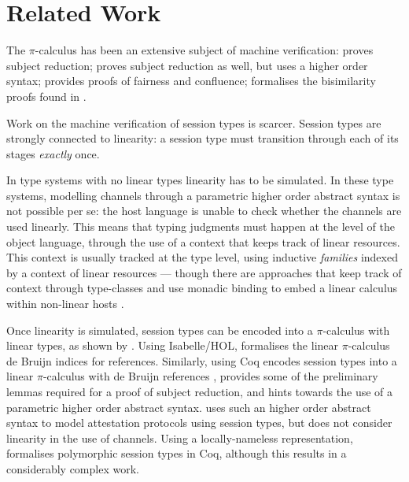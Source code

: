 \documentclass{mproj}
\newcommand{\picalc}{$\pi$-calculus}
\begin{document}

\chapter{Related Work}\label{related-work}

The \picalc{} has been an extensive subject of machine verification: \cite{Henry-Gerard1999} proves subject reduction; \cite{Despeyroux2000} proves subject reduction as well, but uses a higher order syntax; \cite{Affeldt2008} provides proofs of fairness and confluence; \cite{Honsell2001} formalises the bisimilarity proofs found in \cite{Walker1989}.

Work on the machine verification of session types is scarcer.  Session types are strongly connected to linearity: a session type must transition through each of its stages \emph{exactly} once.

In type systems with no linear types linearity has to be simulated. In these type systems, modelling channels through a parametric higher order abstract syntax \cite{Chlipala2008} is not possible per se: the host language is unable to check whether the channels are used linearly. This means that typing judgments must happen at the level of the object language, through the use of a context that keeps track of linear resources.  This context is usually tracked at the type level, using inductive \emph{families} \cite{Dybjer1994} indexed by a context of linear resources \cite{Power2000} --- though there are approaches that keep track of context through type-classes and use monadic binding to embed a linear calculus within non-linear hosts \cite{Paykin2017}. 

Once linearity is simulated, session types can be encoded into a \picalc{} with linear types, as shown by \cite{Kobayashi1996,Dardha2012,Dardha2017}. Using Isabelle/HOL, \cite{Gay2001} formalises the linear \picalc{} de Bruijn indices \cite{deBruijn1972} for references. Similarly, using Coq \cite{Dilmore2019} encodes session types into a linear \picalc{} with de Bruijn references , provides some of the preliminary lemmas required for a proof of subject reduction, and hints towards the use of a parametric higher order abstract syntax. \cite{Petz} uses such an higher order abstract syntax to model attestation protocols using session types, but does not consider linearity in the use of channels. Using a locally-nameless \cite{Chargueraud2012} representation, \cite{Goto2016} formalises polymorphic session types in Coq, although this results in a considerably complex work.
\end{document}
